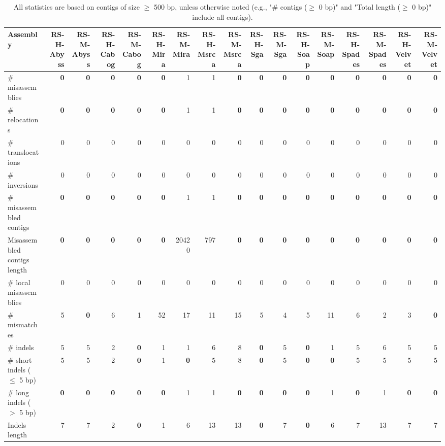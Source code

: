 \documentclass[12pt,a4paper]{article}
\begin{document}
\begin{table}[ht]
\begin{center}
\caption{All statistics are based on contigs of size $\geq$ 500 bp, unless otherwise noted (e.g., "\# contigs ($\geq$ 0 bp)" and "Total length ($\geq$ 0 bp)" include all contigs).}
\begin{tabular}{|l*{16}{|r}|}
\hline
Assembly & RS-H-Abyss & RS-M-Abyss & RS-H-Cabog & RS-M-Cabog & RS-H-Mira & RS-M-Mira & RS-H-Msrca & RS-M-Msrca & RS-H-Sga & RS-M-Sga & RS-H-Soap & RS-M-Soap & RS-H-Spades & RS-M-Spades & RS-H-Velvet & RS-M-Velvet \\ \hline
\# misassemblies & {\bf 0} & {\bf 0} & {\bf 0} & {\bf 0} & {\bf 0} & 1 & 1 & {\bf 0} & {\bf 0} & {\bf 0} & {\bf 0} & {\bf 0} & {\bf 0} & {\bf 0} & {\bf 0} & {\bf 0} \\ \hline
\hspace{5mm}\# relocations & {\bf 0} & {\bf 0} & {\bf 0} & {\bf 0} & {\bf 0} & 1 & 1 & {\bf 0} & {\bf 0} & {\bf 0} & {\bf 0} & {\bf 0} & {\bf 0} & {\bf 0} & {\bf 0} & {\bf 0} \\ \hline
\hspace{5mm}\# translocations & 0 & 0 & 0 & 0 & 0 & 0 & 0 & 0 & 0 & 0 & 0 & 0 & 0 & 0 & 0 & 0 \\ \hline
\hspace{5mm}\# inversions & 0 & 0 & 0 & 0 & 0 & 0 & 0 & 0 & 0 & 0 & 0 & 0 & 0 & 0 & 0 & 0 \\ \hline
\# misassembled contigs & {\bf 0} & {\bf 0} & {\bf 0} & {\bf 0} & {\bf 0} & 1 & 1 & {\bf 0} & {\bf 0} & {\bf 0} & {\bf 0} & {\bf 0} & {\bf 0} & {\bf 0} & {\bf 0} & {\bf 0} \\ \hline
Misassembled contigs length & {\bf 0} & {\bf 0} & {\bf 0} & {\bf 0} & {\bf 0} & 20420 & 797 & {\bf 0} & {\bf 0} & {\bf 0} & {\bf 0} & {\bf 0} & {\bf 0} & {\bf 0} & {\bf 0} & {\bf 0} \\ \hline
\# local misassemblies & 0 & 0 & 0 & 0 & 0 & 0 & 0 & 0 & 0 & 0 & 0 & 0 & 0 & 0 & 0 & 0 \\ \hline
\# mismatches & 5 & {\bf 0} & 6 & 1 & 52 & 17 & 11 & 15 & 5 & 4 & 5 & 11 & 6 & 2 & 3 & {\bf 0} \\ \hline
\# indels & 5 & 5 & 2 & {\bf 0} & 1 & 1 & 6 & 8 & {\bf 0} & 5 & {\bf 0} & 1 & 5 & 6 & 5 & 5 \\ \hline
\hspace{5mm}\# short indels ($\leq$ 5 bp) & 5 & 5 & 2 & {\bf 0} & 1 & {\bf 0} & 5 & 8 & {\bf 0} & 5 & {\bf 0} & {\bf 0} & 5 & 5 & 5 & 5 \\ \hline
\hspace{5mm}\# long indels ($>$ 5 bp) & {\bf 0} & {\bf 0} & {\bf 0} & {\bf 0} & {\bf 0} & 1 & 1 & {\bf 0} & {\bf 0} & {\bf 0} & {\bf 0} & 1 & {\bf 0} & 1 & {\bf 0} & {\bf 0} \\ \hline
Indels length & 7 & 7 & 2 & {\bf 0} & 1 & 6 & 13 & 13 & {\bf 0} & 7 & {\bf 0} & 6 & 7 & 13 & 7 & 7 \\ \hline
\end{tabular}
\end{center}
\end{table}
\end{document}
